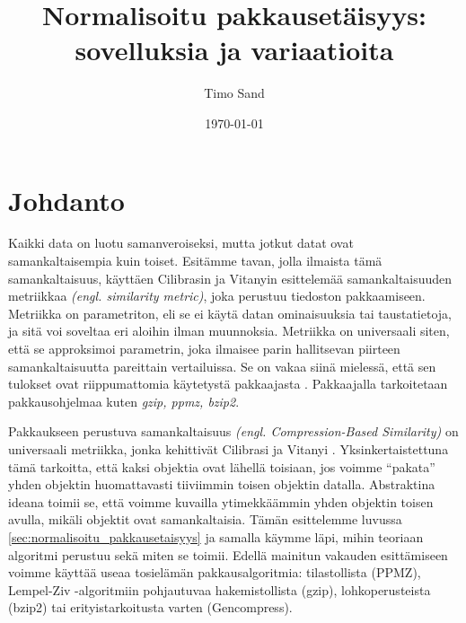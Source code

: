 \documentclass[12pt,finnish,draft]{tktltiki2}
\title{Normalisoitu pakkausetäisyys: sovelluksia ja variaatioita}
\author{Timo Sand}
\date{\today}
\theoremstyle{definition}
\theoremstyle{remark}
\newcommand{\engl}[1]{\emph{(engl. #1)}}
\begin{document}

\frontmatter      %

\maketitle        %
\makeabstract     %

\tableofcontents  %


\mainmatter       %

\section{Johdanto} %
\label{sec:johdanto}
\label{par:intro-1}
  Kaikki data on luotu samanveroiseksi, mutta jotkut datat ovat samankaltaisempia kuin toiset.
  Esitämme tavan, jolla ilmaista tämä samankaltaisuus, käyttäen Cilibrasin ja Vitanyin esittelemää samankaltaisuuden metriikkaa \engl{similarity metric}, joka perustuu tiedoston pakkaamiseen. \cite{CV05}
  Metriikka on parametriton, eli se ei käytä datan ominaisuuksia tai taustatietoja, ja sitä voi soveltaa eri aloihin ilman muunnoksia.
  Metriikka on universaali siten, että se approksimoi parametrin, joka ilmaisee parin hallitsevan piirteen samankaltaisuutta pareittain vertailuissa.
  Se on vakaa siinä mielessä, että sen tulokset ovat riippumattomia käytetystä pakkaajasta \cite{CV05}. Pakkaajalla tarkoitetaan pakkausohjelmaa kuten \emph{gzip, ppmz, bzip2}.

  \label{par:intro-2}
  Pakkaukseen perustuva samankaltaisuus \engl{Compression-Based Similarity} on universaali metriikka, jonka kehittivät Cilibrasi ja Vitanyi \cite{CV05}.
  Yksinkertaistettuna tämä tarkoitta, että kaksi objektia ovat lähellä toisiaan, jos voimme ``pakata'' yhden objektin huomattavasti tiiviimmin toisen objektin datalla.
  Abstraktina ideana toimii se, että voimme kuvailla ytimekkäämmin yhden objektin toisen avulla, mikäli objektit ovat samankaltaisia.
  Tämän esittelemme luvussa \ref{sec:normalisoitu_pakkausetaisyys} ja samalla käymme läpi, mihin teoriaan algoritmi perustuu sekä miten se toimii.
  Edellä mainitun vakauden esittämiseen voimme käyttää useaa tosielämän pakkausalgoritmia: tilastollista (PPMZ), Lempel-Ziv -algoritmiin pohjautuvaa hakemistollista (gzip), lohkoperusteista (bzip2) tai erityistarkoitusta varten (Gencompress).
\end{document}
